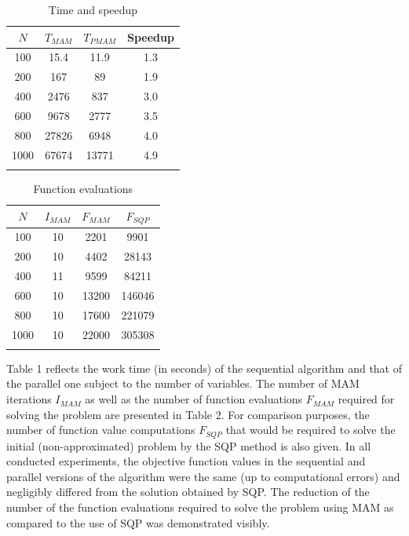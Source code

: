 \documentclass[a4paper]{llncs}
\begin{document}
\begin{table}
	\caption{Time and speedup}
	\label{tab:1}
	\center
	\begin{tabular}{cccc}
		\hline\noalign{\smallskip}
		$N$ & $T_{MAM}$ & $T_{PMAM}$ & Speedup \\
		\hline\noalign{\smallskip}
		100 & 15.4 & 11.9 & 1.3  \\
		200 & 167 &  89 &  1.9 \\
		400 & 2476 &  837 &  3.0 \\
		600 & 9678 &  2777 &  3.5 \\
		800 & 27826 &  6948 &  4.0 \\
		1000 & 67674 &  13771 & 4.9  \\
		\noalign{\smallskip}\hline
	\end{tabular}
\end{table}

\begin{table}
	\caption{Function evaluations}
	\label{tab:2}
	\center
	\begin{tabular}{cccc}
		\hline\noalign{\smallskip}
		$N$ & $I_{MAM}$  & $F_{MAM}$ & $F_{SQP}$ \\
		\hline\noalign{\smallskip}
		100 & 10 &  2201 & 9901 \\
		200 & 10 &  4402 & 28143 \\
		400 & 11 &  9599 &  84211 \\
		600 & 10 &  13200 &  146046 \\
		800 & 10 &  17600 &  221079 \\
		1000 & 10 &  22000 & 305308 \\
		\noalign{\smallskip}\hline
	\end{tabular}
\end{table}

Table 1 reflects the work time (in seconds) of the sequential algorithm and
that of the parallel one subject to the number of variables. The number of MAM
iterations $I_{MAM}$ as well as the number of function evaluations $F_{MAM}$
required for solving the problem are presented in Table 2. For comparison
purposes, the number of function value computations $F_{SQP}$ that would be
required to solve the initial (non-approximated) problem by the SQP method is
also given. In all conducted experiments, the objective function values in the
sequential and parallel versions of the algorithm were the same (up to
computational errors) and negligibly differed from the solution obtained by
SQP. The reduction of the number of the function evaluations required to solve
the problem using MAM as compared to the use of SQP was demonstrated visibly.
\end{document}
